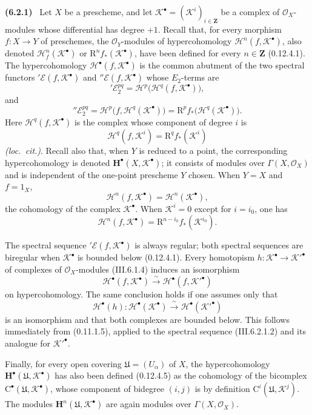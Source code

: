 \documentclass[10pt,oneside]{book}
\newcommand{\sh}[1]{\mathscr{#1}}
\newcommand{\RR}{\mathrm R}
\newcommand{\bb}[1]{\mathbf{#1}}
\newcommand{\sref}[2][]{(#2)}
\newcommand{\oldpage}[2][]{\setcounter{footnote}{0}\marginpar{\scriptsize\textbf{#1}~|~#2}\ignorespaces}
\newenvironment{env}[1][]{\par\medskip\noindent\textbf{(#1)}\ }{\par}
\begin{document}
\begin{env}[6.2.1]
\label{III.6.2.1}
Let $X$ be a prescheme, and let
$\sh{K}^\bullet=(\sh{K}^i)_{i\in\bb{Z}}$ be a complex of
$\sh{O}_X$-modules whose differential has degree $+1$.
Recall that, for every morphism $f:X\to Y$ of preschemes, the
$\sh{O}_Y$-modules of hypercohomology
$\mathcal{H}^n(f,\sh{K}^\bullet)$, also denoted
$\mathcal{H}_f^n(\sh{K}^\bullet)$ or
$\RR^n f_*(\sh{K}^\bullet)$, have been defined for every
$n\in\bb{Z}$ \sref[0]{0.12.4.1}.  The hypercohomology
$\mathcal{H}^\bullet(f,\sh{K}^\bullet)$ is the common abutment of
the two spectral functors
$'\sh{E}(f,\sh{K}^\bullet)$ and
$''\sh{E}(f,\sh{K}^\bullet)$ whose $E_2$-terms are
\[
  '\sh{E}_2^{pq}
  =
  \sh{H}^p\bigl(\sh{H}^q(f,\sh{K}^\bullet)\bigr),
  \tag{6.2.1.1}\label{III.6.2.1.1}
\]
and
\[
  ''\sh{E}_2^{pq}
  =
  \sh{H}^p\bigl(f,\sh{H}^q(\sh{K}^\bullet)\bigr)
  =
  \RR^p f_*\bigl(\sh{H}^q(\sh{K}^\bullet)\bigr).
  \tag{6.2.1.2}\label{III.6.2.1.2}
\]
\oldpage[III]{139}
Here $\sh{H}^q(f,\sh{K}^\bullet)$ is the complex whose component
of degree $i$ is
\[
  \sh{H}^q(f,\sh{K}^i)=\RR^q f_*(\sh{K}^i)
\]
\emph{(loc.\ cit.)}.  Recall also that, when $Y$ is reduced to a
point, the corresponding hypercohomology is denoted
$\mathbf{H}^\bullet(X,\sh{K}^\bullet)$; it consists of modules
over $\Gamma(X,\sh{O}_X)$ and is independent of the one-point
prescheme $Y$ chosen.  When $Y=X$ and $f=1_X$,
\[
  \mathcal{H}^n(f,\sh{K}^\bullet)
  =
  \sh{H}^n(\sh{K}^\bullet),
\]
the cohomology of the complex $\sh{K}^\bullet$.  When
$\sh{K}^i=0$ except for $i=i_0$, one has
\[
  \mathcal{H}^n(f,\sh{K}^\bullet)
  =
  \RR^{n-i_0}f_*(\sh{K}^{i_0}).
\]

The spectral sequence $'\sh{E}(f,\sh{K}^\bullet)$ is always
regular; both spectral sequences are biregular when
$\sh{K}^\bullet$ is bounded below \sref[0]{0.12.4.1}.
Every homotopism
$h:\sh{K}^\bullet\to\sh{K}'^\bullet$ of complexes of
$\sh{O}_X$-modules \sref{III.6.1.4} induces an isomorphism
\[
  \mathcal{H}^\bullet(f,\sh{K}^\bullet)
  \xrightarrow{\ \sim\ }
  \mathcal{H}^\bullet(f,\sh{K}'^\bullet)
\]
on hypercohomology.  The same conclusion holds if one assumes only
that
\[
  \sh{H}^\bullet(h):
  \sh{H}^\bullet(\sh{K}^\bullet)
  \xrightarrow{\ \sim\ }
  \sh{H}^\bullet(\sh{K}'^\bullet)
\]
is an isomorphism and that both complexes are bounded below.  This
follows immediately from \sref[0]{0.11.1.5}, applied to the
spectral sequence \sref{III.6.2.1.2} and its analogue for
$\sh{K}'^\bullet$.

Finally, for every open covering
$\mathfrak{U}=(U_\alpha)$ of $X$, the hypercohomology
$\mathbf{H}^\bullet(\mathfrak{U},\sh{K}^\bullet)$ has also been
defined \sref[0]{0.12.4.5} as the cohomology of the bicomplex
$\mathrm{C}^\bullet(\mathfrak{U},\sh{K}^\bullet)$, whose component
of bidegree $(i,j)$ is by definition
$\mathrm{C}^i(\mathfrak{U},\sh{K}^j)$.  The modules
$\mathbf{H}^n(\mathfrak{U},\sh{K}^\bullet)$ are again modules over
$\Gamma(X,\sh{O}_X)$.
\end{env}
\end{document}
